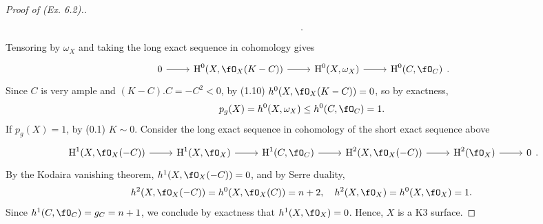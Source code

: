 \documentclass[a4paper]{article}
\begin{document}
\begin{enumerate} [label=\textbf{\arabic*.}, leftmargin=0em]
\begin{proof} [Proof of (Ex. 6.2).]
\[\begin{tikzcd}
                        \end{tikzcd} . \]
                  Tensoring by $\omega_X$ and taking the long exact sequence in cohomology gives
                  \[ \begin{tikzcd}
                              0 \arrow[r] & \cH^0(X, \fO_X(K -C)) \arrow[r] & \cH^0(X, \omega_X) \arrow[r] & \cH^0(C, \fO_C)
                        \end{tikzcd} . \]
                  Since $C$ is very ample and $(K - C).C = -C^2 < 0$, by (1.10) $h^0(X, \fO_X(K - C)) = 0$, so by exactness,
                  \begin{equation*}
                        p_g(X) = h^0(X, \omega_X) \leq h^0(C, \fO_C) = 1.
                  \end{equation*}
                  If $p_g(X) = 1$, by (0.1) $K \sim 0$.
                  Consider the long exact sequence in cohomology of the short exact sequence above
                  \[ \begin{tikzcd}
                              {\cH^1(X, \fO_X(-C))} \arrow[r] & {\cH^1(X, \fO_X)} \arrow[r] & {\cH^1(C, \fO_C)} \arrow[r] & {\cH^2(X, \fO_X(-C))} \arrow[r] & \cH^2(\fO_X) \arrow[r] & 0
                        \end{tikzcd} .\]
                  By the Kodaira vanishing theorem, $h^1(X, \fO_X(-C)) = 0$, and by Serre duality,
                  \begin{equation*}
                        h^2(X, \fO_X(-C)) = h^0(X, \fO_X(C)) = n + 2, \quad h^2(X, \fO_X) = h^0(X, \fO_X) = 1.
                  \end{equation*}
                  Since $h^1(C, \fO_C) = g_C = n + 1$, we conclude by exactness that $h^1(X, \fO_X) = 0$.
                  Hence, $X$ is a K3 surface.
            \end{proof}
\end{enumerate}
\end{document}
